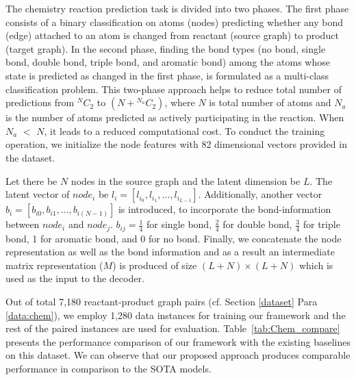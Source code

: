 The chemistry reaction prediction task is divided into two phases. The first phase consists of a binary classification on atoms (nodes) predicting whether any bond (edge) attached to an atom is changed from reactant (source graph) to product (target graph). In the second phase, finding the bond types (no bond, single bond, double bond, triple bond, and aromatic bond) among the atoms whose state is predicted as changed in the first phase, is formulated as a multi-class classification problem. This two-phase approach helps to reduce total number of predictions from ${}^NC_2$ to $\left(N+{}^{N_a}C_2\right)$, where $N$ is total number of atoms and $N_a$ is the number of atoms predicted as actively participating in the reaction. When $N_a$ $<$ $N$, it leads to a reduced computational cost. To conduct the training operation, we initialize the node features with 82 dimensional vectors provided in the dataset.

Let there be $N$ nodes in the source graph and the latent dimension be $L$. The latent vector of $node_i$ be $l_i=[l_{i_0}, l_{i_1}, \dots , l_{i_{L-1}}]$. Additionally, another vector $b_i=[b_{i0}, b_{i1}, \dots , b_{i(N-1)}]$ is introduced, to incorporate the bond-information between $node_i$ and $node_j$. $b_{ij}=\frac{1}{4}$ for single bond, $\frac{2}{4}$ for double bond, $\frac{3}{4}$ for triple bond, 1 for aromatic bond, and 0 for no bond. Finally, we concatenate the node representation as well as the bond information and as a result an intermediate matrix representation ($M$) is produced of size $(L+N)\times (L+N)$ which is used as the input to the decoder.



Out of total 7,180 reactant-product graph pairs (cf. Section  \ref{dataset} Para \ref{data:chem}), we employ 1,280 data instances for training our framework and the rest of the paired instances are used for evaluation. Table~\ref{tab:Chem_compare} presents the performance comparison of our framework with the existing baselines on this dataset. We can observe that our proposed approach produces comparable performance in comparison to the SOTA models.






